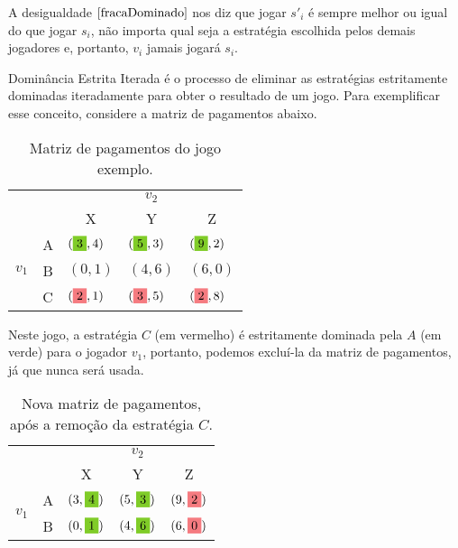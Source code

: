 A desigualdade $\eqref{fracaDominado}$ nos diz que jogar $s'_{i}$ é sempre melhor ou igual do que jogar $s_i$, não importa qual seja a estratégia escolhida pelos demais jogadores e, portanto, $v_i$ jamais jogará $s_i$.

Dominância Estrita Iterada é o processo de eliminar as estratégias estritamente dominadas iteradamente para obter o resultado de um jogo. Para exemplificar esse conceito, considere a matriz de pagamentos abaixo.

\begin{table}[h]
\begin{center}
    \begin{tabular}{ccccc}
        & & \multicolumn{3}{c}{$v_2$} \\
        & & X & Y & Z \\ \cline{3-5} 
        \multirow{3}{*}{$v_1$} & \multicolumn{1}{c|}{A} & \multicolumn{1}{l|}{$(\colorbox{LimeGreen}{3},4)$} & \multicolumn{1}{l|}{$(\colorbox{LimeGreen}{5},3)$} & \multicolumn{1}{l|}{$(\colorbox{LimeGreen}{9},2)$} \\ \cline{3-5} 
        & \multicolumn{1}{c|}{B} & \multicolumn{1}{l|}{$(0,1)$}  & \multicolumn{1}{l|}{$(4,6)$} & \multicolumn{1}{l|}{$(6,0)$}  \\ \cline{3-5} 
        & \multicolumn{1}{l|}{C} & \multicolumn{1}{l|}{$(\colorbox{Salmon}{2},1)$}  & \multicolumn{1}{l|}{$(\colorbox{Salmon}{3},5)$} & \multicolumn{1}{l|}{$(\colorbox{Salmon}{2},8)$} \\ \cline{3-5} 
    \end{tabular}
    \caption{Matriz de pagamentos do jogo exemplo.}
    \label{mpjdi1}
\end{center}
\end{table}
Neste jogo, a estratégia $C$ (em vermelho) é estritamente dominada pela $A$ (em verde) para o jogador $v_1$, portanto, podemos excluí-la da matriz de pagamentos, já que nunca será usada.

\begin{table}[h]
\begin{center}
    \begin{tabular}{ccccc}
        & & \multicolumn{3}{c}{$v_2$} \\
        & & X & Y & Z \\ \cline{3-5} 
        \multirow{2}{*}{$v_1$} & \multicolumn{1}{c|}{A} & \multicolumn{1}{l|}{$(3,\colorbox{LimeGreen}{4})$} & \multicolumn{1}{l|}{$(5,\colorbox{LimeGreen}{3})$} & \multicolumn{1}{l|}{$(9,\colorbox{Salmon}{2})$} \\ \cline{3-5} 
        & \multicolumn{1}{c|}{B} & \multicolumn{1}{l|}{$(0,\colorbox{LimeGreen}{1})$}  & \multicolumn{1}{l|}{$(4,\colorbox{LimeGreen}{6})$} & \multicolumn{1}{l|}{$(6,\colorbox{Salmon}{0})$}  \\ \cline{3-5} 
    \end{tabular}
    \caption{Nova matriz de pagamentos, após a remoção da estratégia $C$.}
    \label{mpjdi2}
\end{center}
\end{table}

